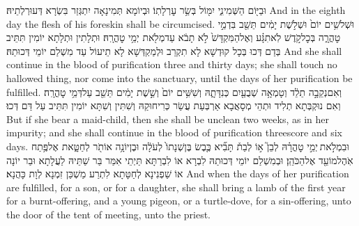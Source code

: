 {וּבַיּ֖וֹם הַשְּׁמִינִ֑י יִמּ֖וֹל בְּשַׂ֥ר עׇרְלָתֽוֹ׃}
{וּבְיוֹמָא תְּמִינָאָה יִתְגְּזַר בִּשְׂרָא דְּעוּרְלְתֵיהּ׃}
{And in the eighth day the flesh of his foreskin shall be circumcised.}{}
{וּשְׁלֹשִׁ֥ים יוֹם֙ וּשְׁלֹ֣שֶׁת יָמִ֔ים תֵּשֵׁ֖ב בִּדְמֵ֣י טׇהֳרָ֑ה בְּכׇל\maqqaf קֹ֣דֶשׁ לֹֽא\maqqaf תִגָּ֗ע וְאֶל\maqqaf הַמִּקְדָּשׁ֙ לֹ֣א תָבֹ֔א עַד\maqqaf מְלֹ֖את יְמֵ֥י טׇהֳרָֽהּ׃}
{וּתְלָתִין וּתְלָתָא יוֹמִין תִּתֵּיב בְּדַם דְּכוּ בְּכָל קוּדְשָׁא לָא תִקְרַב וּלְמַקְדְּשָׁא לָא תֵיעוֹל עַד מִשְׁלַם יוֹמֵי דְּכוּתַהּ׃}
{And she shall continue in the blood of purification three and thirty days; she shall touch no hallowed thing, nor come into the sanctuary, until the days of her purification be fulfilled.}{}
{וְאִם\maqqaf נְקֵבָ֣ה תֵלֵ֔ד וְטָמְאָ֥ה שְׁבֻעַ֖יִם כְּנִדָּתָ֑הּ וְשִׁשִּׁ֥ים יוֹם֙ וְשֵׁ֣שֶׁת יָמִ֔ים תֵּשֵׁ֖ב עַל\maqqaf דְּמֵ֥י טׇהֳרָֽה׃}
{וְאִם נוּקְבְּתָא תְלִיד וּתְהֵי מְסָאֲבָא אַרְבְּעַת עֲשַׂר כְּרִיחוּקַהּ וְשִׁתִּין וְשִׁתָּא יוֹמִין תִּתֵּיב עַל דַּם דְּכוּ׃}
{But if she bear a maid-child, then she shall be unclean two weeks, as in her impurity; and she shall continue in the blood of purification threescore and six days.}{}
{וּבִמְלֹ֣את \legarmeh  יְמֵ֣י טׇהֳרָ֗הּ לְבֵן֮ א֣וֹ לְבַת֒ תָּבִ֞יא כֶּ֤בֶשׂ בֶּן\maqqaf שְׁנָתוֹ֙ לְעֹלָ֔ה וּבֶן\maqqaf יוֹנָ֥ה אוֹ\maqqaf תֹ֖ר לְחַטָּ֑את אֶל\maqqaf פֶּ֥תַח אֹֽהֶל\maqqaf מוֹעֵ֖ד אֶל\maqqaf הַכֹּהֵֽן׃}
{וּבְמִשְׁלַם יוֹמֵי דְּכוּתַהּ לִבְרָא אוֹ לִבְרַתָּא תַּיְתֵי אִמַּר בַּר שַׁתֵּיהּ לַעֲלָתָא וּבַר יוֹנָה אוֹ שַׁפְנִינָא לְחַטָּתָא לִתְרַע מַשְׁכַּן זִמְנָא לְוָת כָּהֲנָא׃}
{And when the days of her purification are fulfilled, for a son, or for a daughter, she shall bring a lamb of the first year for a burnt-offering, and a young pigeon, or a turtle-dove, for a sin-offering, unto the door of the tent of meeting, unto the priest.}{}
